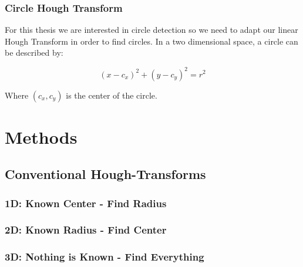 \documentclass[10pt,twoside]{scrreprt}
\begin{document}


\subsection{Circle Hough Transform} %
\label{sub:circle_hough_transform}

For this thesis we are interested in circle detection so we need to adapt our linear Hough Transform in order to find circles. In a two dimensional space, a circle can be described by:

\begin{equation}
		(x-c_x)^2 + (y-c_y)^2 = r^2
\end{equation}

Where $(c_x,c_y)$ is the center of the circle.




\chapter{Methods}

\section{Conventional Hough-Transforms} %
\label{sec:conventional_hough_transforms}


\subsection{1D: Known Center - Find Radius} %
\label{sub:1d_known_center_find_radius}



\subsection{2D: Known Radius - Find Center} %
\label{sub:2d_known_radius_find_center}


\subsection{3D: Nothing is Known - Find Everything} %
\label{sub:3d_nothing_is_known_find_everything}
\end{document}
